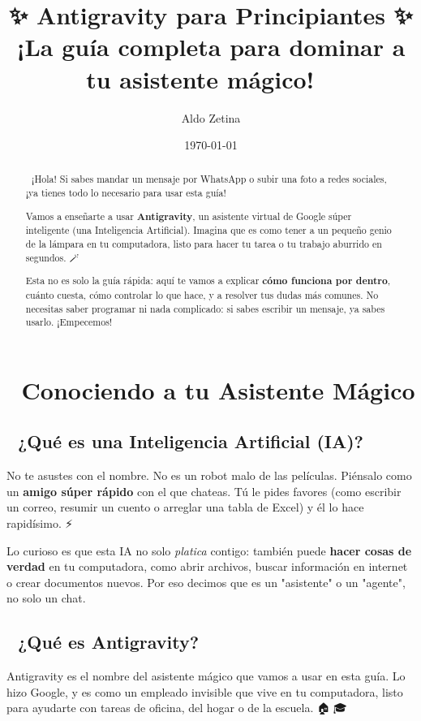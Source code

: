 \documentclass[12pt]{article}
\title{✨ Antigravity para Principiantes ✨\\
\large ¡La guía completa para dominar a tu asistente mágico! 🧞‍♂️}
\author{Aldo Zetina}
\date{\today}
\begin{document}

\maketitle

\begin{abstract}
🚀 ¡Hola! Si sabes mandar un mensaje por WhatsApp o subir una foto a redes sociales, ¡ya tienes todo lo necesario para usar esta guía!

Vamos a enseñarte a usar \textbf{Antigravity}, un asistente virtual de Google súper inteligente (una Inteligencia Artificial). Imagina que es como tener a un pequeño genio de la lámpara en tu computadora, listo para hacer tu tarea o tu trabajo aburrido en segundos. 🪄

Esta no es solo la guía rápida: aquí te vamos a explicar \textbf{cómo funciona por dentro}, cuánto cuesta, cómo controlar lo que hace, y a resolver tus dudas más comunes. No necesitas saber programar ni nada complicado: si sabes escribir un mensaje, ya sabes usarlo. ¡Empecemos! 🎉
\end{abstract}

\tableofcontents
\newpage

\section{👋 Conociendo a tu Asistente Mágico}

\subsection{🤖 ¿Qué es una Inteligencia Artificial (IA)?}
No te asustes con el nombre. No es un robot malo de las películas. Piénsalo como un \textbf{amigo súper rápido} con el que chateas. Tú le pides favores (como escribir un correo, resumir un cuento o arreglar una tabla de Excel) y él lo hace rapidísimo. ⚡

Lo curioso es que esta IA no solo \textit{platica} contigo: también puede \textbf{hacer cosas de verdad} en tu computadora, como abrir archivos, buscar información en internet o crear documentos nuevos. Por eso decimos que es un "asistente" o un "agente", no solo un chat.

\subsection{🧞 ¿Qué es Antigravity?}
Antigravity es el nombre del asistente mágico que vamos a usar en esta guía. Lo hizo Google, y es como un empleado invisible que vive en tu computadora, listo para ayudarte con tareas de oficina, del hogar o de la escuela. 🏠🏢🎓
\end{document}
